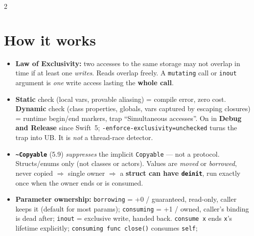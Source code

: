 \documentclass[8pt]{extarticle}
\begin{document}



\begin{multicols}{2}
\raggedright

\section{How it works}
\begin{itemize}
  \item \textbf{Law of Exclusivity:} two accesses to the same storage may not
        overlap in time if at least one \emph{writes}. Reads overlap freely.
        A \texttt{mutating} call or \texttt{inout} argument is \emph{one}
        write access lasting the \textbf{whole call}.
  \item \textbf{Static} check (local vars, provable aliasing) = compile error,
        zero cost. \textbf{Dynamic} check (class properties, globals, vars
        captured by escaping closures) = runtime begin/end markers, trap
        ``Simultaneous accesses''. On in \textbf{Debug and Release} since Swift~5;
        \texttt{-enforce-exclusivity=unchecked} turns the trap into UB.
        It is \emph{not} a thread-race detector.
  \item \textbf{\texttt{\textasciitilde Copyable}} (5.9) \emph{suppresses} the implicit
        \texttt{Copyable} — not a protocol. Structs/enums only (not classes or
        actors). Values are \emph{moved} or \emph{borrowed}, never copied
        $\Rightarrow$ single owner $\Rightarrow$ a \textbf{struct can have
        \texttt{deinit}}, run exactly once when the owner ends or is consumed.
  \item \textbf{Parameter ownership:} \texttt{borrowing} = +0 / guaranteed,
        read-only, caller keeps it (default for most params);
        \texttt{consuming} = +1 / owned, caller's binding is dead after;
        \texttt{inout} = exclusive write, handed back.
        \texttt{consume x} ends \texttt{x}'s lifetime explicitly;
        \texttt{consuming func close()} consumes \texttt{self};

\end{itemize}
\end{multicols}
\end{document}
